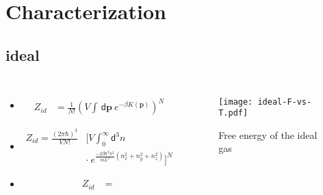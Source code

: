 \documentclass{beamer}
\newcommand*{\diff}{\mathsf{d}}
\begin{document}
\section*{Characterization}
\subsection*{ideal}
\begin{frame}
	\begin{columns}[t]
			\begin{itemize}
				\item \begin{align*}
					Z_{id} &= \frac{1}{N!}\left(V\int \,\diff\mathbf{p}~e^{-\beta K(\mathbf{p})}\right)^{N}	 	
				\end{align*}
				\item %
				\begin{align*}
				Z_{id} = \frac{(2\pi\hbar)^3}{V N!}&\Big[V \int_0^\infty \diff^3 n \\
				& \cdot ~e^{ \frac{-2\beta \hbar^2\pi^2}{mL^2}(n_x^2 + n_y^2 + n_z^2)}\Big]^{N} 	
				\end{align*} 
				\item \begin{align*}
					Z_{id} &= \frac{}{}
				\end{align*}
			\end{itemize}
			\begin{figure}
 				\texttt{[image: ideal-F-vs-T.pdf]}
 				\caption{\tiny Free energy of the ideal gas}
 				\label{ideal}
 			\end{figure}
	\end{columns}
\end{frame}
\end{document}
